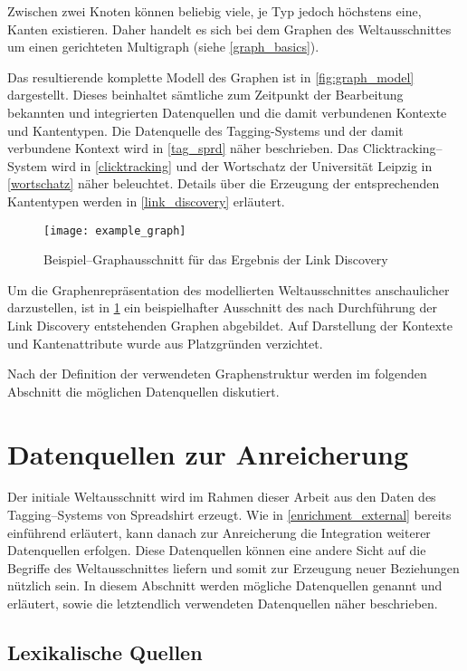 Zwischen zwei Knoten können beliebig viele, je Typ jedoch höchstens eine, Kanten existieren. Daher handelt es sich bei dem Graphen des Weltausschnittes um einen gerichteten Multigraph (siehe \cref{graph_basics}).

Das resultierende komplette Modell des Graphen ist in \cref{fig:graph_model} dargestellt. Dieses beinhaltet sämtliche zum Zeitpunkt der Bearbeitung bekannten und integrierten Datenquellen und die damit verbundenen Kontexte und Kantentypen. Die Datenquelle des Tagging-Systems und der damit verbundene Kontext wird in \cref{tag_sprd} näher beschrieben. Das Clicktracking--System wird in \cref{clicktracking} und der Wortschatz der Universität Leipzig in \cref{wortschatz} näher beleuchtet. Details über die Erzeugung der entsprechenden Kantentypen werden in \cref{link_discovery} erläutert.

\begin{figure}[t]
\centering
\texttt{[image: example\_graph]}
\caption{Beispiel--Graphausschnitt für das Ergebnis der Link Discovery}
\label{fig:example_graph}
\end{figure}

Um die Graphenrepräsentation des modellierten Weltausschnittes anschaulicher darzustellen, ist in \cref{fig:example_graph} ein beispielhafter Ausschnitt des nach Durchführung der Link Discovery entstehenden Graphen abgebildet. Auf Darstellung der Kontexte und Kantenattribute wurde aus Platzgründen verzichtet.

Nach der Definition der verwendeten Graphenstruktur werden im folgenden Abschnitt die möglichen Datenquellen diskutiert.

\section{Datenquellen zur Anreicherung}

Der initiale Weltausschnitt wird im Rahmen dieser Arbeit aus den Daten des Tagging--Systems von Spreadshirt erzeugt. Wie in \cref{enrichment_external} bereits einführend erläutert, kann danach zur Anreicherung die Integration weiterer Datenquellen erfolgen. Diese Datenquellen können eine andere Sicht auf die Begriffe des Weltausschnittes liefern und somit zur Erzeugung neuer Beziehungen nützlich sein. In diesem Abschnitt werden mögliche Datenquellen genannt und erläutert, sowie die letztendlich verwendeten Datenquellen näher beschrieben.

\subsection{Lexikalische Quellen}
\label{lexical_sources}

